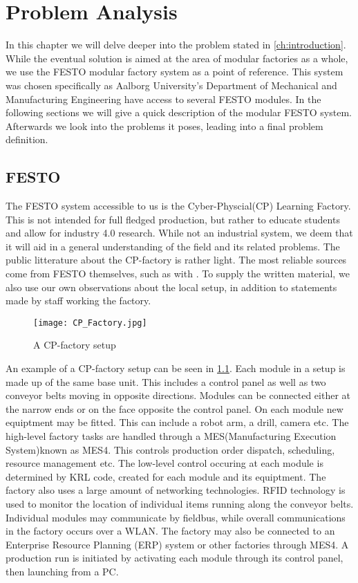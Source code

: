\chapter{Problem Analysis}\label{ch:problemanalysis}
In this chapter we will delve deeper into the problem stated in \cref{ch:introduction}. While the eventual solution is aimed at the area of modular factories as a whole, we use the FESTO modular factory system \cite{FESTOweb} as a point of reference. This system was chosen specifically as Aalborg University's Department of Mechanical and Manufacturing Engineering have access to several FESTO modules. In the following sections we will give a quick description of the modular FESTO system. Afterwards we look into the problems it poses, leading into a final problem definition.  

\section{FESTO}\label{sec:festo}
The FESTO system accessible to us is the Cyber-Physcial(CP) Learning Factory. This is not intended for full fledged production, but rather to educate students and allow for industry 4.0 research. While not an industrial system, we deem that it will aid in a general understanding of the field and its related problems. The public litterature about the CP-factory is rather light. The most reliable sources come from FESTO themselves, such as with \cite{CPFactory2015}. To supply the written material, we also use our own observations about the local setup, in addition to statements made by staff working the factory.  

\begin{figure}[h]
\centering
\texttt{[image: CP\_Factory.jpg]}
\caption{A CP-factory setup}
\label{fig:festo-example}
\end{figure}

An example of a CP-factory setup can be seen in \cref{fig:festo-example}. Each module in a setup is made up of the same base unit. This includes a control panel as well as two conveyor belts moving in opposite directions. Modules can be connected either at the narrow ends or on the face opposite the control panel. On each module new equiptment may be fitted. This can include a robot arm, a drill, camera etc. The high-level factory tasks are handled through a MES(Manufacturing Execution System)known as MES4. This controls production order dispatch, scheduling, resource management etc. The low-level control occuring at each module is determined by KRL code, created for each module and its equiptment. The factory also uses a large amount of networking technologies. RFID technology is used to monitor the location of individual items running along the conveyor belts. Individual modules may communicate by fieldbus, while overall communications in the factory occurs over a WLAN. The factory may also be connected to an Enterprise Resource Planning (ERP) system or other factories through MES4. A production run is initiated by activating each module through its control panel, then launching from a PC.

